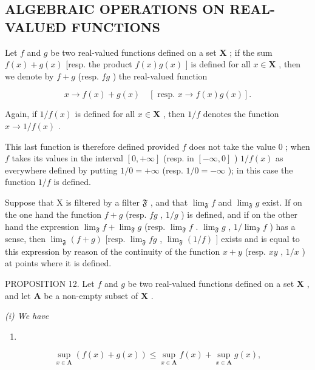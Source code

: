 \subsection{ALGEBRAIC OPERATIONS ON REAL-VALUED FUNCTIONS}

Let \(f\) and \(g\) be two real-valued functions defined on a set \(\mathbf{X}\) ; if the sum \(f(x) + g(x)\) {[}resp. the product \(f(x)g(x)\) {]} is defined for all \(x \in \mathbf{X}\) , then we denote by \(f + g\) (resp. \(fg\) ) the real-valued function

\[
x \rightarrow f (x) + g (x) \quad [ \text { resp. } x \rightarrow f (x) g (x) ].
\]

Again, if \(1 / f(x)\) is defined for all \(x\in \mathbf{X}\) , then \(1 / f\) denotes the function \(x\to 1 / f(x)\) .

This last function is therefore defined provided \(f\) does not take the value \(0\) ; when \(f\) takes its values in the interval \([0, +\infty]\) (resp. in \([-\infty, 0]\) ) \(1/f(x)\) as everywhere defined by putting \(1/0 = +\infty\) (resp. \(1/0 = -\infty\) ); in this case the function \(1/f\) is defined.

Suppose that X is filtered by a filter \(\mathfrak{F}\) , and that \(\lim_{\mathfrak{F}} f\) and \(\lim_{\mathfrak{F}} g\) exist. If on the one hand the function \(f + g\) (resp. \(fg\) , \(1/g\) ) is defined, and if on the other hand the expression \(\lim_{\mathfrak{F}} f + \lim_{\mathfrak{F}} g\) (resp. \(\lim_{\mathfrak{F}} f\) . \(\lim_{\mathfrak{F}} g\) , \(1/\lim_{\mathfrak{F}} f\) ) has a sense, then \(\lim_{\mathfrak{F}} (f + g)\) {[}resp. \(\lim_{\mathfrak{F}} fg\) , \(\lim_{\mathfrak{F}} (1/f)\) {]} exists and is equal to this expression by reason of the continuity of the function \(x + y\) (resp. \(xy\) , \(1/x\) ) at points where it is defined.

PROPOSITION 12. Let \(f\) and \(g\) be two real-valued functions defined on a set \(\mathbf{X}\) , and let \(\mathbf{A}\) be a non-empty subset of \(\mathbf{X}\) .

\textit{(i) We have}

\begin{enumerate}
\def\labelenumi{(\arabic{enumi})}
\setcounter{enumi}{16}
\tightlist
\item
\end{enumerate}

\[
\sup _ {x \in \mathbf {A}} (f (x) + g (x)) \leqslant \sup _ {x \in \mathbf {A}} f (x) + \sup _ {x \in \mathbf {A}} g (x),\tag{17}
\]

